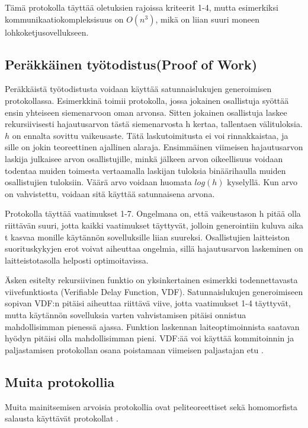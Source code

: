 \documentclass{article}
\begin{document}
Tämä protokolla täyttää oletuksien rajoissa kriteerit 1-4, mutta esimerkiksi kommunikaatiokompleksisuus on $O(n^3)$\cite{syta_scalable_2017}, mikä on liian suuri moneen lohkoketjusovellukseen.

\subsection{Peräkkäinen työtodistus(Proof of Work)}
Peräkkäistä työtodistusta voidaan käyttää satunnaislukujen generoimisen protokollassa\cite{lesaege_kleros_2020}. Esimerkkinä toimii protokolla, jossa jokainen osallistuja syöttää ensin yhteiseen siemenarvoon oman arvonsa. Sitten jokainen osallistuja laskee rekursiivisesti hajautusarvon tästä siemenarvosta h kertaa, tallentaen välituloksia. $h$ on ennalta sovittu vaikeusaste. Tätä laskutoimitusta ei voi rinnakkaistaa, ja sille on jokin teoreettinen ajallinen alaraja. Ensimmäinen viimeisen hajautusarvon laskija julkaisee arvon osallistujille, minkä jälkeen arvon oikeellisuus voidaan todentaa muiden toimesta vertaamalla laskijan tuloksia binäärihaulla muiden osallistujien tuloksiin. Väärä arvo voidaan huomata  $log(h)$ kyselyllä. Kun arvo on vahvistettu, voidaan sitä käyttää satunnaisena arvona.

Protokolla täyttää vaatimukset 1-7. Ongelmana on, että vaikeustason h pitää olla riittävän suuri, jotta kaikki vaatimukset täyttyvät, jolloin generointiin kuluva aika t kasvaa monille käytännön sovelluksille liian suureksi. Osallistujien laitteiston suorituskykyjen erot voivat aiheuttaa ongelmia, sillä hajautusarvon laskeminen on laitteistotasolla helposti optimoitavissa.

Äsken esitelty rekursiivinen funktio on yksinkertainen esimerkki todennettavasta viivefunktiosta (Verifiable Delay Function, VDF). Satunnaislukujen generoimiseen sopivan VDF:n pitäisi aiheuttaa riittävä viive, jotta vaatimukset 1-4 täyttyvät, mutta käytännön sovelluksia varten vahvistamisen pitäisi onnistua mahdollisimman pienessä ajassa. Funktion laskennan laiteoptimoinnista saatavan hyödyn pitäisi olla mahdollisimman pieni. VDF:ää voi käyttää kommitoinnin ja paljastamisen protokollan osana poistamaan viimeisen paljastajan etu \cite{boneh_verifiable_2018}.

\subsection{Muita protokollia}
Muita mainitsemisen arvoisia protokollia ovat peliteoreettiset sekä homomorfista salausta käyttävät protokollat \cite{simic_review_2020}. 



\end{document}
